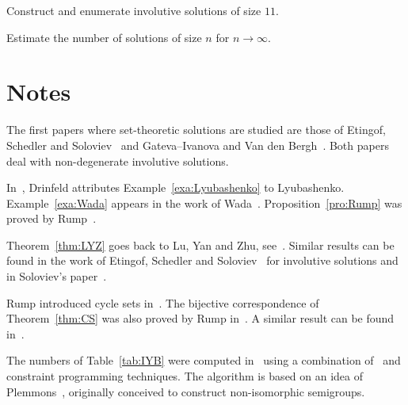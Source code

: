 \begin{problem}
Construct and enumerate involutive solutions of size $11$. 
\end{problem}

\begin{problem}
Estimate the number of solutions of size $n$ for $n\to\infty$. 
\end{problem}

\section*{Notes}

The first papers where set-theoretic solutions are studied are those of Etingof, Schedler and Soloviev~\cite{MR1722951} 
and Gateva--Ivanova and Van den Bergh~\cite{MR1637256}. Both papers deal with non-degenerate involutive solutions. 

In~\cite{MR1183474}, Drinfeld attributes Example~\ref{exa:Lyubashenko} to 
Lyubashenko. Example~\ref{exa:Wada} 
appears in the work of Wada~\cite{MR1167178}. Proposition~\ref{pro:Rump} 
was proved by Rump~\cite{MR2278047}. 

Theorem~\ref{thm:LYZ} goes back to Lu, Yan and Zhu, see~\cite{MR1769723}.
Similar results can be found in the work of Etingof, Schedler and Soloviev~\cite{MR1722951} for involutive solutions and 
in Soloviev's paper~\cite{MR1809284}. 

Rump introduced cycle sets in~\cite{MR2132760}. The bijective correspondence of 
Theorem~\ref{thm:CS} was 
also proved by Rump in~\cite{MR2132760}. A similar result can be 
found in~\cite[Proposition 2.2]{MR1722951}. 

The numbers of Table~\ref{tab:IYB} were computed in~\cite{AMV}
using a combination of~\cite{GAP4} and constraint programming techniques. 
The algorithm is based on an idea of Plemmons~\cite{MR0258994}, originally 
conceived to construct non-isomorphic semigroups.  
